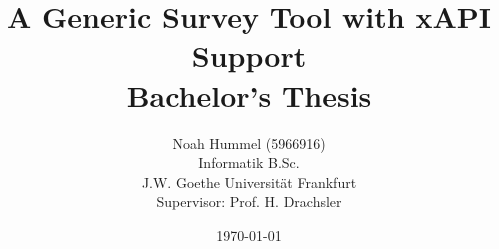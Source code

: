     \rfoot{\thepage}

    \title{A Generic Survey Tool with xAPI Support \\ Bachelor's Thesis \\ }
    \date{\today}
    \author{Noah Hummel (5966916) \\ Informatik B.Sc. \\ J.W. Goethe Universität Frankfurt \\ Supervisor: Prof. H. Drachsler}
    

    \newcommand{\addstretch}[1]{\addtolength{#1}{\fill}}
    \newenvironment{onepage}
      {\newpage\flushbottom
       \addstretch{\baselineskip}
       \addstretch{\abovedisplayskip}
       \addstretch{\abovedisplayshortskip}
       \addstretch{\belowdisplayskip}
       \addstretch{\belowdisplayshortskip}
       \setlength{\parskip}{0pt}}
      {\newpage}

    \DeclarePairedDelimiter\abs{\lvert}{\rvert}

    \newcommand{\profhd}{Prof. H. Drachsler }

    \def\inline{\lstinline[basicstyle=\ttfamily,keywordstyle={}]}

    \newcommand{\zcomp}{\underline{Z}}
    \newcommand{\cmp}[1]{\underline{#1}}